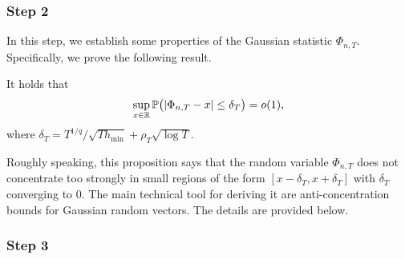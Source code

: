 \subsubsection*{Step 2}


In this step, we establish some properties of the Gaussian statistic $\Phi_{n,T}$. Specifically, we prove the following result.  
\begin{propA}\label{propA:anticon}
It holds that 
\begin{equation*}
\sup_{x \in \mathbb{R}} \mathbb{P} \big( | \Phi_{n,T} - x | \le \delta_T \big) = o(1),
\end{equation*}
where $\delta_T = T^{1/q} / \sqrt{T h_{\min}} + \rho_T \sqrt{\log T}$.
\end{propA}
Roughly speaking, this proposition says that the random variable $\Phi_{n,T}$ does not concentrate too strongly in small regions of the form $[x-\delta_T,x+\delta_T]$ with $\delta_T$ converging to $0$. The main technical tool for deriving it are anti-concentration bounds for Gaussian random vectors. The details are provided below. 


\subsubsection*{Step 3}


